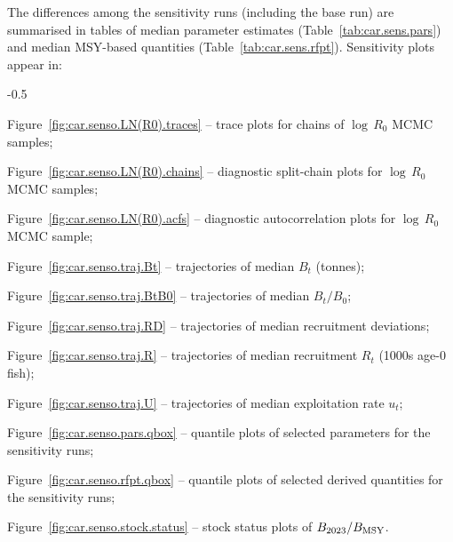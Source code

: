 \documentclass[11pt]{book}
\newcommand{\Bmsy}{B_\text{MSY}}
\begin{document}
The differences among the sensitivity runs (including the base run) are summarised in tables of median parameter estimates (Table~\ref{tab:car.sens.pars}) and median MSY-based quantities (Table~\ref{tab:car.sens.rfpt}).
Sensitivity plots appear in:
\begin{itemize_csas}{-0.5}{}
  \item Figure~\ref{fig:car.senso.LN(R0).traces} -- trace plots for chains of $\log\,R_0$ MCMC samples;
  \item Figure~\ref{fig:car.senso.LN(R0).chains} -- diagnostic split-chain plots for $\log\,R_0$ MCMC samples;
  \item Figure~\ref{fig:car.senso.LN(R0).acfs} -- diagnostic autocorrelation plots for $\log\,R_0$ MCMC sample;
  \item Figure~\ref{fig:car.senso.traj.Bt} -- trajectories of median $B_t$ (tonnes);
  \item Figure~\ref{fig:car.senso.traj.BtB0} -- trajectories of median $B_t/B_0$;
  \item Figure~\ref{fig:car.senso.traj.RD} -- trajectories of median recruitment deviations;
  \item Figure~\ref{fig:car.senso.traj.R} -- trajectories of median recruitment $R_t$ (1000s age-0 fish);
  \item Figure~\ref{fig:car.senso.traj.U} -- trajectories of median exploitation rate $u_t$;
  \item Figure~\ref{fig:car.senso.pars.qbox} -- quantile plots of selected parameters for the sensitivity runs;
  \item Figure~\ref{fig:car.senso.rfpt.qbox} -- quantile plots of selected derived quantities for the sensitivity runs;
  \item Figure~\ref{fig:car.senso.stock.status} -- stock status plots of $B_{\currYear}/\Bmsy$.
 \end{itemize_csas}

\end{document}
